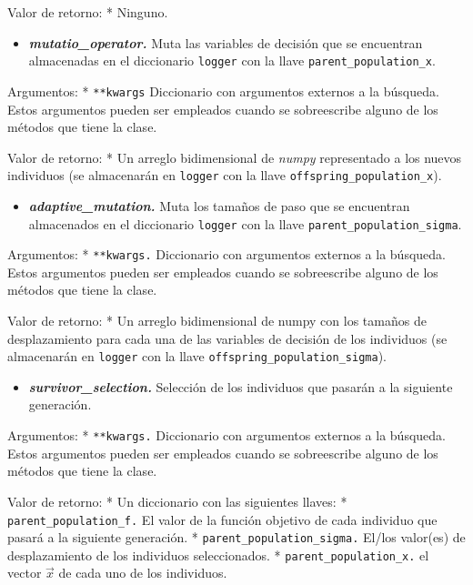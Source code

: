 \documentclass[11pt]{article}
\providecommand{\tightlist}{%
      \setlength{\itemsep}{0pt}\setlength{\parskip}{0pt}}
\begin{document}
Valor de retorno: * Ninguno.

\begin{itemize}
\tightlist
\item
  \emph{\textbf{mutatio\_operator.}} Muta las variables de decisión que
  se encuentran almacenadas en el diccionario \texttt{logger} con la
  llave \texttt{parent\_population\_x}.
\end{itemize}

Argumentos: * \texttt{**kwargs} Diccionario con argumentos externos a la
búsqueda. Estos argumentos pueden ser empleados cuando se sobreescribe
alguno de los métodos que tiene la clase.

Valor de retorno: * Un arreglo bidimensional de \emph{numpy}
representado a los nuevos individuos (se almacenarán en \texttt{logger}
con la llave \texttt{offspring\_population\_x}).

\begin{itemize}
\tightlist
\item
  \emph{\textbf{adaptive\_mutation.}} Muta los tamaños de paso que se
  encuentran almacenados en el diccionario \texttt{logger} con la llave
  \texttt{parent\_population\_sigma}.
\end{itemize}

Argumentos: * \texttt{**kwargs.} Diccionario con argumentos externos a
la búsqueda. Estos argumentos pueden ser empleados cuando se
sobreescribe alguno de los métodos que tiene la clase.

Valor de retorno: * Un arreglo bidimensional de numpy con los tamaños de
desplazamiento para cada una de las variables de decisión de los
individuos (se almacenarán en \texttt{logger} con la llave
\texttt{offspring\_population\_sigma}).

\begin{itemize}
\tightlist
\item
  \emph{\textbf{survivor\_selection.}} Selección de los individuos que
  pasarán a la siguiente generación.
\end{itemize}

Argumentos: * \texttt{**kwargs.} Diccionario con argumentos externos a
la búsqueda. Estos argumentos pueden ser empleados cuando se
sobreescribe alguno de los métodos que tiene la clase.

Valor de retorno: * Un diccionario con las siguientes llaves: *
\texttt{parent\_population\_f.} El valor de la función objetivo de cada
individuo que pasará a la siguiente generación. *
\texttt{parent\_population\_sigma.} El/los valor(es) de desplazamiento
de los individuos seleccionados. * \texttt{parent\_population\_x.} el
vector \(\vec{x}\) de cada uno de los individuos.
\end{document}
